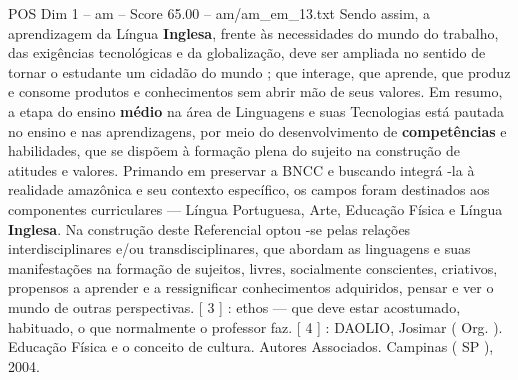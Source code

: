 \begin{textsample}{POS Dim 1 – am – Score 65.00 – am/am\_em\_13.txt}
Sendo assim, a aprendizagem da Língua \textbf{Inglesa}, frente às necessidades do mundo do trabalho, das exigências tecnológicas e da globalização, deve ser ampliada no sentido de tornar o estudante um cidadão do mundo ; que interage, que aprende, que produz e consome produtos e conhecimentos sem abrir mão de seus valores.
Em resumo, a etapa do ensino \textbf{médio} na área de Linguagens e suas Tecnologias está pautada no ensino e nas aprendizagens, por meio do desenvolvimento de \textbf{competências} e habilidades, que se dispõem à formação plena do sujeito na construção de atitudes e valores.
Primando em preservar a BNCC e buscando integrá -la à realidade amazônica e seu contexto específico, os campos foram destinados aos componentes curriculares — Língua Portuguesa, Arte, Educação Física e Língua \textbf{Inglesa}.
Na construção deste Referencial optou -se pelas relações interdisciplinares e/ou transdisciplinares, que abordam as linguagens e suas manifestações na formação de sujeitos, livres, socialmente conscientes, criativos, propensos a aprender e a ressignificar conhecimentos adquiridos, pensar e ver o mundo de outras perspectivas. [ 3 ] : ethos — que deve estar acostumado, habituado, o que normalmente o professor faz. [ 4 ] : DAOLIO, Josimar ( Org. ).
Educação Física e o conceito de cultura.
Autores Associados.
Campinas ( SP ), 2004.

\end{textsample}
